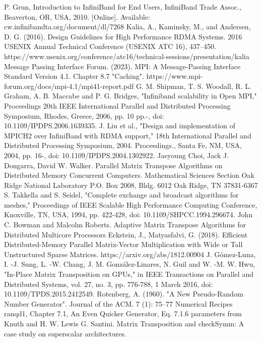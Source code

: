\documentclass[conference]{IEEEtran}
\begin{document}
\begin{thebibliography}{00}
 P. Grun, Introduction to InfiniBand for End Users, InfiniBand
Trade Assoc., Beaverton, OR, USA, 2010. [Online]. Available:
cw.infinibandta.org/document/dl/7268
 Kalia, A., Kaminsky, M., and Andersen, D. G. (2016). Design Guidelines for High Performance RDMA Systems. 2016 USENIX Annual Technical Conference (USENIX ATC 16), 437–450. https://www.usenix.org/conference/atc16/technical-sessions/presentation/kalia 
 Message Passing Interface Forum. (2023). MPI: A Message-Passing Interface Standard Version 4.1. Chapter 8.7 "Caching". https://www.mpi-forum.org/docs/mpi-4.1/mpi41-report.pdf 
 G. M. Shipman, T. S. Woodall, R. L. Graham, A. B. Maccabe and P. G. Bridges, "Infiniband scalability in Open MPI," Proceedings 20th IEEE International Parallel and Distributed Processing Symposium, Rhodes, Greece, 2006, pp. 10 pp.-, doi: 10.1109/IPDPS.2006.1639335.
 J. Liu et al., "Design and implementation of MPICH2 over InfiniBand with RDMA support," 18th International Parallel and Distributed Processing Symposium, 2004. Proceedings., Santa Fe, NM, USA, 2004, pp. 16-, doi: 10.1109/IPDPS.2004.1302922.
 Jaeyoung Choi, Jack J. Dongarra, David W. Walker.  Parallel Matrix Transpose Algorithms on Distributed Memory Concurrent Computers.  Mathematical Sciences Section Oak Ridge National Laboratory P.O. Box 2008, Bldg. 6012 Oak Ridge, TN 37831-6367
 S. Takkella and S. Seidel, "Complete exchange and broadcast algorithms for meshes," Proceedings of IEEE Scalable High Performance Computing Conference, Knoxville, TN, USA, 1994, pp. 422-428, doi: 10.1109/SHPCC.1994.296674.
 John C. Bowman and Malcolm Roberts. Adaptive Matrix Transpose Algorithms for Distributed Multicore Processors
 Eckstein, J., Matyasfalvi, G. (2018). Efficient Distributed-Memory Parallel Matrix-Vector Multiplication with Wide or Tall Unstructured Sparse Matrices. https://arxiv.org/abs/1812.00904 
 J. Gómez-Luna, I. -J. Sung, L. -W. Chang, J. M. González-Linares, N. Guil and W. -M. W. Hwu, "In-Place Matrix Transposition on GPUs," in IEEE Transactions on Parallel and Distributed Systems, vol. 27, no. 3, pp. 776-788, 1 March 2016, doi: 10.1109/TPDS.2015.2412549.
 Rotenberg, A. (1960). "A New Pseudo-Random Number Generator". Journal of the ACM. 7 (1): 75–77
 Numerical Recipes ranqd1, Chapter 7.1, An Even Quicker Generator, Eq. 7.1.6
parameters from Knuth and H. W. Lewis
 G. Santini. Matrix Transposition and checkSymm: A case study on superscalar architectures.
\end{thebibliography}
\vspace{12pt}
\end{document}
